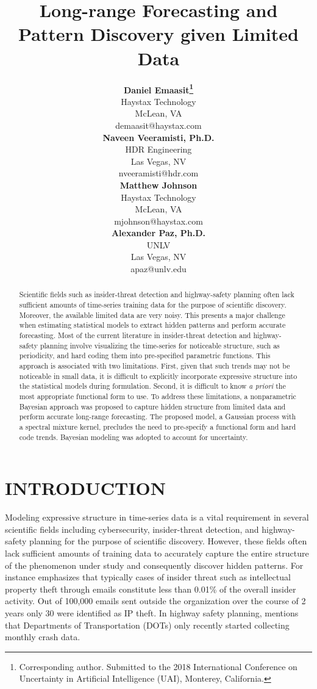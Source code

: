 \documentclass[letterpaper]{article}
\title{Long-range Forecasting and Pattern Discovery given Limited Data}
\author{} %
\author{ {\bf Daniel Emaasit\thanks{Corresponding author. Submitted to the 2018 International Conference on Uncertainty in Artificial Intelligence (UAI), Monterey, California.}} \\
Haystax Technology \\
McLean, VA    \\
demaasit@haystax.com\\
\And
{\bf Naveen Veeramisti, Ph.D.}  \\
HDR Engineering          \\
Las Vegas, NV \\
nveeramisti@hdr.com \\
\And
{\bf Matthew Johnson}   \\
Haystax Technology \\
McLean, VA    \\
mjohnson@haystax.com\\
\And
{\bf Alexander Paz, Ph.D.}   \\
UNLV \\
Las Vegas, NV    \\
apaz@unlv.edu\\
}
\begin{document}
\maketitle

\begin{abstract}
Scientific fields such as insider-threat detection and highway-safety planning often lack sufficient amounts of time-series training data for the purpose of scientific discovery. Moreover, the available limited data are very noisy. This presents a major challenge when estimating statistical models to extract hidden patterns and perform accurate forecasting. Most of the current literature in insider-threat detection and highway-safety planning involve visualizing the time-series for noticeable structure, such as periodicity, and hard coding them into pre-specified parametric functions. This approach is associated with two limitations. First, given that such trends may not be noticeable in small data, it is difficult to explicitly incorporate expressive structure into the statistical models during formulation.  Second, it is difficult to know \textit{a priori} the most appropriate functional form to use. To address these limitations, a nonparametric Bayesian approach was proposed to capture hidden structure from limited data and perform accurate long-range forecasting. The proposed model, a Gaussian process with a spectral mixture kernel, precludes the need to pre-specify a functional form and hard code trends. Bayesian modeling was adopted to account for uncertainty.
\end{abstract}

\section{INTRODUCTION}

Modeling expressive structure in time-series data is a vital requirement in several scientific fields including cybersecurity, insider-threat detection, and highway-safety planning for the purpose of scientific discovery. However, these fields often lack sufficient amounts of training data to accurately capture the entire structure of the phenomenon under study and consequently discover hidden patterns. For instance \citet{schrag2016probabilistic} emphasizes that typically cases of insider threat such as intellectual property theft through emails constitute less than 0.01\% of the overall insider activity. Out of 100,000 emails sent outside the organization over the course of 2 years only 30 were identified as IP theft. In highway safety planning, \cite{veeramisti2016business} mentions that Departments of Transportation (DOTs) only recently started collecting monthly crash data. 
\lipsum[1-1]
\end{document}
